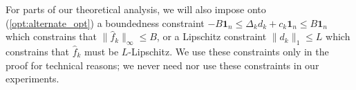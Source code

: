 \begin{remark}
\label{rem:bounded_lipschitz_constraints}
For parts of our theoretical analysis, we will also impose onto (\ref{opt:alternate_opt}) a boundedness constraint $-B \mathbf{1}_n \leq \Delta_k d_k + c_k \mathbf{1}_n \leq B \mathbf{1}_n$ which constrains that $\|\hat{f}_k \|_\infty \leq B$, or a Lipschitz constraint $\|d_k\|_1 \leq L$ which constrains that $\hat{f}_k$ must be $L$-Lipschitz. We use these constraints only in the proof for technical reasons; we never need nor use these constraints in our experiments.
\end{remark}

\def\hat#1{\widehat{#1}}

